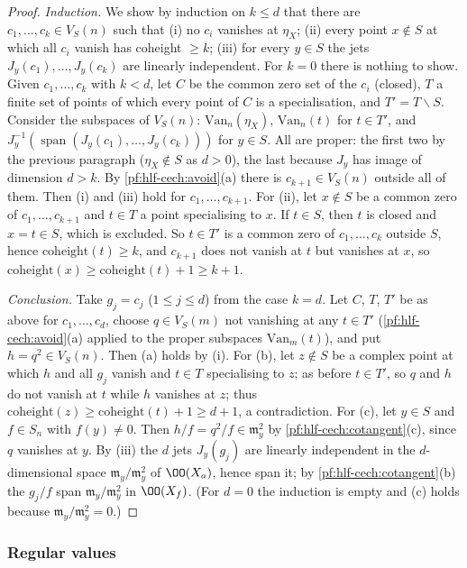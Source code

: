 \begin{proof}
\emph{Induction.} We show by induction on $k\le d$ that there are $c_1,\dots,c_k\in V_S(n)$ such that (i) no $c_i$ vanishes at $\eta_X$;
(ii) every point $x\notin S$ at which all $c_i$ vanish has coheight $\ge k$; (iii) for every $y\in S$ the jets $J_y(c_1),\dots,J_y(c_k)$ are
linearly independent. For $k=0$ there is nothing to show. Given $c_1,\dots,c_k$ with $k<d$, let $C$ be the common zero set of the $c_i$ (closed),
$T$ a finite set of points of which every point of $C$ is a specialisation, and $T'=T\smallsetminus S$. Consider the subspaces of $V_S(n)$:
$\mathrm{Van}_n(\eta_X)$, $\mathrm{Van}_n(t)$ for $t\in T'$, and $J_y^{-1}(\operatorname{span}(J_y(c_1),\dots,J_y(c_k)))$ for $y\in S$. All are proper:
the first two by the previous paragraph ($\eta_X\notin S$ as $d>0$), the last because $J_y$ has image of dimension $d>k$. By
\cref{pf:hlf-cech:avoid}(a) there is $c_{k+1}\in V_S(n)$ outside all of them. Then (i) and (iii) hold for $c_1,\dots,c_{k+1}$. For (ii), let
$x\notin S$ be a common zero of $c_1,\dots,c_{k+1}$ and $t\in T$ a point specialising to $x$. If $t\in S$, then $t$ is closed and $x=t\in S$, which is
excluded. So $t\in T'$ is a common zero of $c_1,\dots,c_k$ outside $S$, hence $\mathrm{coheight}(t)\ge k$, and $c_{k+1}$ does not vanish at $t$ but
vanishes at $x$, so $\mathrm{coheight}(x)\ge\mathrm{coheight}(t)+1\ge k+1$.

\emph{Conclusion.} Take $g_j=c_j$ ($1\le j\le d$) from the case $k=d$. Let $C$, $T$, $T'$ be as above for $c_1,\dots,c_d$, choose $q\in V_S(m)$
not vanishing at any $t\in T'$ (\cref{pf:hlf-cech:avoid}(a) applied to the proper subspaces $\mathrm{Van}_m(t)$), and put $h=q^2\in V_S(n)$.
Then (a) holds by (i). For (b), let $z\notin S$ be a complex point at which $h$ and all $g_j$ vanish and $t\in T$ specialising to $z$; as
before $t\in T'$, so $q$ and $h$ do not vanish at $t$ while $h$ vanishes at $z$; thus $\mathrm{coheight}(z)\ge\mathrm{coheight}(t)+1\ge d+1$, a
contradiction. For (c), let $y\in S$ and $f\in S_n$ with $f(y)\ne0$. Then $h/f=q^2/f\in\mathfrak m_y^2$ by \cref{pf:hlf-cech:cotangent}(c), since
$q$ vanishes at $y$. By (iii) the $d$ jets $J_y(g_j)$ are linearly independent in the $d$-dimensional space $\mathfrak m_y/\mathfrak m_y^2$ of
$\OO(X_a)$, hence span it; by \cref{pf:hlf-cech:cotangent}(b) the $g_j/f$ span $\mathfrak m_y/\mathfrak m_y^2$ in $\OO(X_f)$. (For $d=0$ the
induction is empty and (c) holds because $\mathfrak m_y/\mathfrak m_y^2=0$.)
\end{proof}

\subsubsection{Regular values}

